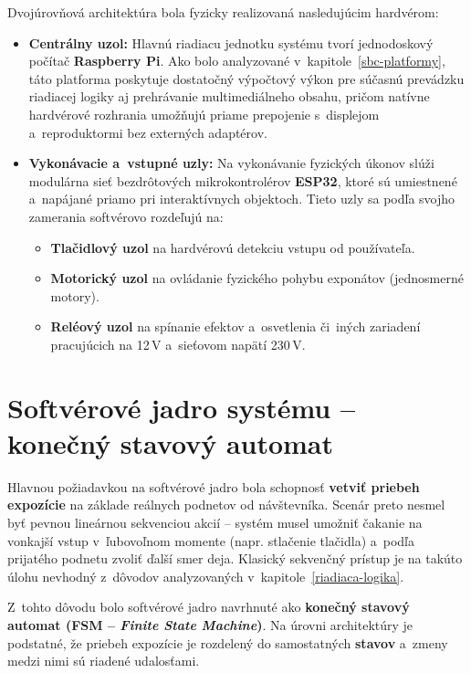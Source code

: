 Dvojúrovňová architektúra bola fyzicky realizovaná nasledujúcim hardvérom:
\begin{itemize}
    \item \textbf{Centrálny uzol:} Hlavnú riadiacu jednotku
        systému tvorí jednodoskový počítač \textbf{Raspberry Pi}. Ako bolo
        analyzované v~kapitole~\ref{sbc-platformy}, táto platforma poskytuje
        dostatočný výpočtový výkon pre súčasnú prevádzku riadiacej logiky
        aj prehrávanie multimediálneho obsahu, pričom natívne hardvérové
        rozhrania umožňujú priame prepojenie s~displejom a~reproduktormi
        bez externých adaptérov.
    \item \textbf{Vykonávacie a~vstupné uzly:} Na vykonávanie
        fyzických úkonov slúži modulárna sieť bezdrôtových mikrokontrolérov
        \textbf{ESP32}, ktoré sú umiestnené a~napájané priamo pri
        interaktívnych objektoch. Tieto uzly sa podľa svojho zamerania
        softvérovo rozdeľujú na:
        \begin{itemize}
            \item \textbf{Tlačidlový uzol} na hardvérovú detekciu vstupu
                od používateľa.
            \item \textbf{Motorický uzol} na ovládanie fyzického pohybu
                exponátov (jednosmerné motory).
            \item \textbf{Reléový uzol} na spínanie efektov a~osvetlenia
                či~iných zariadení pracujúcich na 12\,V a~sieťovom napätí
                230\,V.
        \end{itemize}
\end{itemize}

\section{Softvérové jadro systému -- konečný stavový automat}
\label{SoftverovArchitektura}

Hlavnou požiadavkou na softvérové jadro bola schopnosť
\textbf{vetviť priebeh expozície} na základe reálnych
podnetov od návštevníka. Scenár preto nesmel byť pevnou
lineárnou sekvenciou akcií -- systém musel umožniť čakanie
na vonkajší vstup v~ľubovoľnom momente (napr. stlačenie
tlačidla) a~podľa prijatého podnetu zvoliť ďalší smer deja.
Klasický sekvenčný prístup je na takúto úlohu nevhodný
z~dôvodov analyzovaných v~kapitole~\ref{riadiaca-logika}.

Z~tohto dôvodu bolo softvérové jadro navrhnuté ako
\textbf{konečný stavový automat (FSM -- \textit{Finite State Machine})}.
Na úrovni architektúry je podstatné, že priebeh expozície je
rozdelený do samostatných \textbf{stavov} a~zmeny medzi nimi
sú riadené udalosťami.

